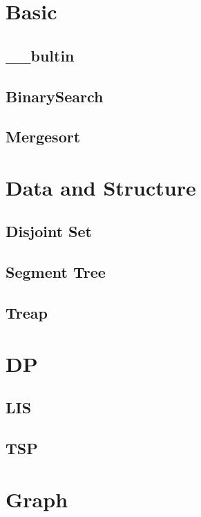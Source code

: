 \section{Basic}

\subsection{__bultin}

\subsection{BinarySearch}

\subsection{Mergesort}


\section{Data and Structure}

\subsection{Disjoint Set}

\subsection{Segment Tree}

\subsection{Treap}



\section{DP}

\subsection{LIS}

\subsection{TSP}


\section{Graph}

